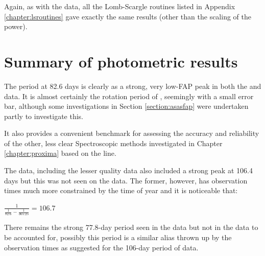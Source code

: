 Again, as with the {\asas} data, all the Lomb-Scargle routines listed in Appendix \ref{chapter:lsroutines} gave exactly
the same results (other than the scaling of the power).

\section{Summary of photometric results}
\protect\label{section:summphotometric}

The period at 82.6 days is clearly as a strong, very low-FAP peak in both the {\asas} and {\hst} data. It is almost
certainly the rotation period of {\prox}, seemingly with a small error bar, although some investigations in Section
\ref{section:asasfap} were undertaken partly to investigate this.

It also provides a convenient benchmark for assessing the accuracy and reliability of the other, less clear
Spectroscopic methods investigated in Chapter \ref{chapter:proxima} based on the {\ha} line.

The {\asas} data, including the lesser quality data also included a strong peak at 106.4 days but this was not seen on
the {\hst} data. The former, however, has observation times much more constrained by the time of year and it is
noticeable that:

\begin{center}

$ \frac{1}{\frac{1}{82.6} - \frac{1}{365.25}} = 106.7 $

\end{center}

There remains the strong 77.8-day period seen in the {\hst} data but not in the {\asas} data to be accounted for,
possibly this period is a similar alias thrown up by the observation times as suggested for the 106-day period of
{\asas} data.

